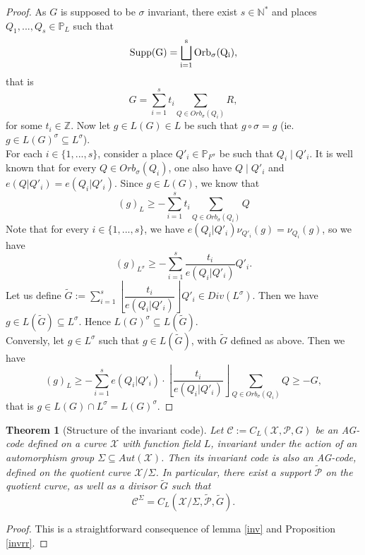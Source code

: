 \documentclass[10pt]{article}
\newtheorem{thm}{Theorem}[]
\newcommand{\s}{\vspace{0.3cm}}
\newcommand{\cd}{\cdot}
\newcommand{\N}{\mathbb{N}}
\newcommand{\Z}{\mathbb{Z}}
\newcommand{\su}{\subseteq}
\newcommand{\X}{\mathcal{X}}
\newcommand{\PR}{\mathcal{P}}
\begin{document}
\begin{proof}
As $G$ is supposed to be $\sigma$ invariant, there exist $s \in \N^*$ and places $Q_1,...,Q_s \in \mathbb{P}_L$ such that 
\[\rm{Supp(G)} = \bigsqcup_{i=1}^s Orb_{\sigma}(Q_i),\]
that is 
\[G = \sum\limits_{i=1}^s t_i \sum\limits_{Q \in Orb_{\sigma}(Q_i)} R,\]
for some $t_i \in \Z$. Now let $g \in L(G) \in L$ be such that $g \circ \sigma = g$ (ie. $g \in L(G)^{\sigma} \su L^{\sigma}$). \\
For each $i \in \{1,...,s\}$, consider a place $Q'_i \in \mathbb{P}_{F^{\sigma}}$ be such that $Q_i \mid Q'_i$. It is well known that for every $Q \in Orb_{\sigma}(Q_i)$, one also have $Q \mid Q'_i$ and $e(Q|Q'_i)=e(Q_i|Q'_i)$. Since $g \in L(G)$, we know that
\[(g)_L \geq - \sum\limits_{i=1}^s t_i \sum\limits_{Q \in Orb_{\sigma}(Q_i)} Q\]
Note that for every $i \in \{1,...,s\}$, we have $e(Q_i|Q'_i)\nu_{Q'_i}(g) = \nu_{Q_i}(g)$, so we have 
\[(g)_{L^{\sigma}} \geq - \sum\limits_{i=1}^s \dfrac{t_i}{e(Q_i|Q'_i)}  Q'_i.\]
Let us define $\tilde{G}:= \sum\limits_{i=1}^s \left\lfloor\dfrac{t_i}{e(Q_i|Q'_i)}\right\rfloor  Q'_i \in Div(L^{\sigma})$. Then we have $g \in L(\tilde{G}) \su L^{\sigma}$. Hence $L(G)^{\sigma} \su L(\tilde{G})$. \\
Conversly, let $g \in L^{\sigma}$ such that $g \in L(\tilde{G})$, with $\tilde{G}$ defined as above. Then we have 
\[ (g)_L \geq -\sum\limits_{i=1}^s e(Q_i|Q'_i) \cd \left\lfloor\dfrac{t_i}{e(Q_i|Q'_i)}\right\rfloor \sum\limits_{Q \in Orb_{\sigma}(Q_i)} Q \geq -G,\]
that is $g \in L(G) \cap L^{\sigma} = L(G)^{\sigma}$.
\end{proof}

\s

\begin{thm} [Structure of the invariant code] \label{invstruct}
Let $\mathcal{C} := C_L(\X,\PR,G)$ be an AG-code defined on a curve $\X$ with function field $L$, invariant under the action of an automorphism group $\Sigma \su Aut(\X)$. Then its invariant code is also an AG-code, defined on the quotient curve $\X/\Sigma$. In particular, there exist a support $\tilde{\PR}$ on the quotient curve, as well as a divisor $\tilde{G}$ such that
\[\mathcal{C}^{\Sigma} = C_L(\X/\Sigma,\tilde{\PR},\tilde{G}).\]
\end{thm}

\s
 
\begin{proof}
This is a straightforward consequence of lemma \ref{inv} and Proposition \ref{invrr}.
\end{proof}
\end{document}
